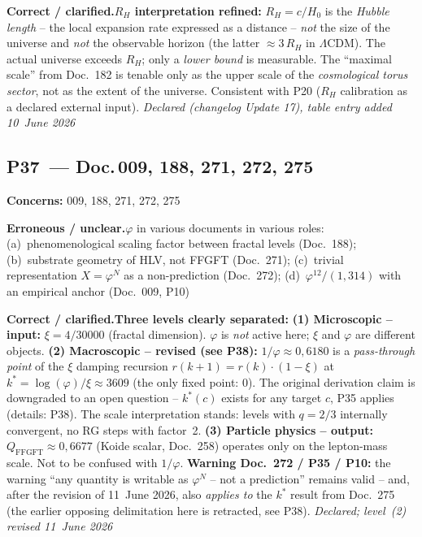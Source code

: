 \smallskip\noindent\textbf{Correct / clarified.}\quad \textbf{$R_H$ interpretation refined:} $R_H = c/H_0$ is the \emph{Hubble length} -- the local expansion rate expressed as a distance -- \emph{not} the size of the universe and \emph{not} the observable horizon (the latter $\approx 3\,R_H$ in $\Lambda$CDM). The actual universe exceeds $R_H$; only a \emph{lower bound} is measurable. The \enquote{maximal scale} from Doc.~182 is tenable only as the upper scale of the \emph{cosmological torus sector}, not as the extent of the universe. Consistent with P20 ($R_H$ calibration as a declared external input). \emph{Declared (changelog Update 17), table entry added 10~June 2026}


\medskip


\subsection*{P37~--- Doc.\,009, 188, 271, 272, 275}

\noindent\textbf{Concerns:} 009, 188, 271, 272, 275


\smallskip\noindent\textbf{Erroneous / unclear.}\quad $\varphi$ in various documents in various roles: (a)~phenomenological scaling factor between fractal levels (Doc.~188); (b)~substrate geometry of HLV, not FFGFT (Doc.~271); (c)~trivial representation $X=\varphi^N$ as a non-prediction (Doc.~272); (d)~$\varphi^{12}/(1{,}314)$ with an empirical anchor (Doc.~009, P10)


\smallskip\noindent\textbf{Correct / clarified.}\quad \textbf{Three levels clearly separated:}
  \newline
  \textbf{(1) Microscopic -- input:} $\xi = 4/30000$ (fractal dimension). $\varphi$ is \emph{not} active here; $\xi$ and $\varphi$ are different objects.
  \newline
  \textbf{(2) Macroscopic -- revised (see P38):} $1/\varphi \approx 0{,}6180$ is a \emph{pass-through point} of the $\xi$ damping recursion $r(k+1)=r(k)\cdot(1-\xi)$ at $k^* = \log(\varphi)/\xi \approx 3609$ (the only fixed point: $0$). The original derivation claim is downgraded to an open question -- $k^*(c)$ exists for any target $c$, P35 applies (details: P38). The scale interpretation stands: levels with $q=2/3$ internally convergent, no RG steps with factor~2.
  \newline
  \textbf{(3) Particle physics -- output:} $Q_\mathrm{FFGFT}\approx 0{,}6677$ (Koide scalar, Doc.~258) operates only on the lepton-mass scale. Not to be confused with $1/\varphi$.
  \newline
  \textbf{Warning Doc.~272 / P35 / P10:} the warning \enquote{any quantity is writable as $\varphi^N$ -- not a prediction} remains valid -- and, after the revision of 11~June 2026, also \emph{applies to} the $k^*$ result from Doc.~275 (the earlier opposing delimitation here is retracted, see P38). \emph{Declared; level~(2) revised 11~June 2026}


